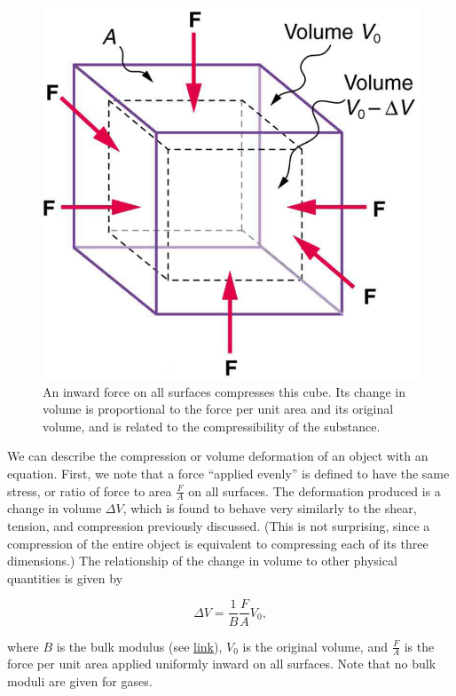 \documentclass[
]{book}
\begin{document}
\begin{figure}
\hypertarget{import-auto-id1165296230954}{%
\centering
\includegraphics{images/Figure_06_03_09a.jpg}
\caption{An inward force on all surfaces compresses this cube. Its change in
volume is proportional to the force per unit area and its original
volume, and is related to the compressibility of the
substance.}\label{import-auto-id1165296230954}
}
\end{figure}

We can describe the compression or volume deformation of an object with
an equation. First, we note that a force ``applied evenly'' is defined to
have the same stress, or ratio of force to area \(\frac{F}{A}{}\) on all
surfaces. The deformation produced is a change in volume \({\Delta V}{}\),
which is found to behave very similarly to the shear, tension, and
compression previously discussed. (This is not surprising, since a
compression of the entire object is equivalent to compressing each of
its three dimensions.) The relationship of the change in volume to other
physical quantities is given by

\leavevmode{}%
\[{{{\Delta V = \frac{1}{B}}\frac{F}{A}V_{0}},}{}\]

where \(B\) is the bulk modulus (see
\protect\hyperlink{import-auto-id1165298671576}{link}), \(V_{0}{}\)
is the original volume, and \emph{\(\frac{F}{A}{}\)} is the force per unit area
applied uniformly inward on all surfaces. Note that no bulk moduli are
given for gases.
\end{document}
